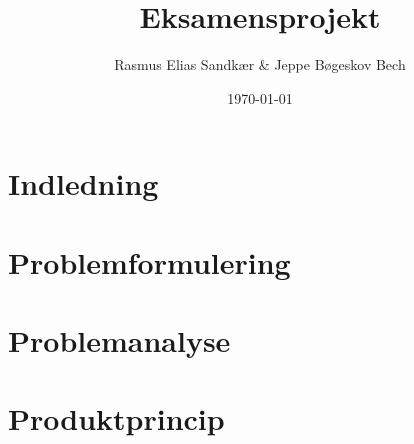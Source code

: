 \documentclass[12pt]{article}
\author{Rasmus Elias Sandkær \& Jeppe Bøgeskov Bech}
\date{\today}
\title{Eksamensprojekt}
\begin{document}
    
    \restoregeometry
    \tableofcontents
    \newpage

    \section{Indledning}
    \label{indledning}
    
    
    \newpage
    \section{Problemformulering}
    \label{problemformulering}
    

    \newpage
    \label{problemanalyse}
    \section{Problemanalyse}
    

    \newpage 
    \label{produktprincip}
    \section{Produktprincip}
    


    \newpage
    \printbibliography[heading=bibintoc,title={Litteraturliste}]
\end{document}
